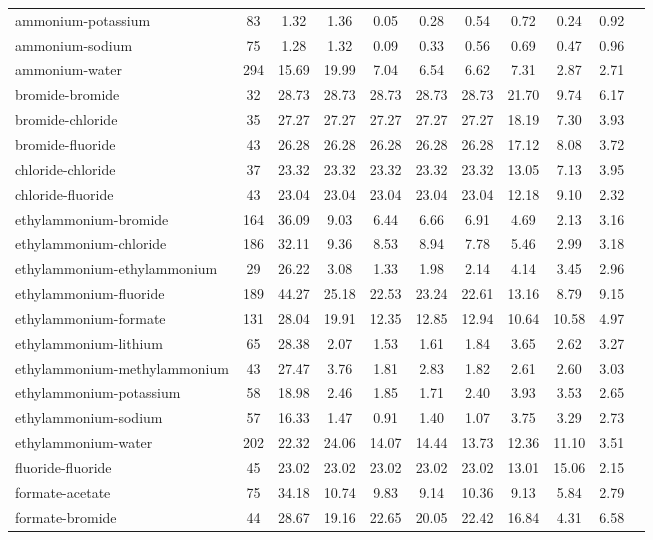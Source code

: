 \begin{longtable}{lcccccccccc}
ammonium-potassium & 83  & 1.32 & 1.36 & 0.05 & 0.28 & 0.54 & 0.72 & 0.24 & 0.92\\
ammonium-sodium & 75  & 1.28 & 1.32 & 0.09 & 0.33 & 0.56 & 0.69 & 0.47 & 0.96\\
ammonium-water & 294  & 15.69 & 19.99 & 7.04 & 6.54 & 6.62 & 7.31 & 2.87 & 2.71\\
bromide-bromide & 32  & 28.73 & 28.73 & 28.73 & 28.73 & 28.73 & 21.70 & 9.74 & 6.17\\
bromide-chloride & 35  & 27.27 & 27.27 & 27.27 & 27.27 & 27.27 & 18.19 & 7.30 & 3.93\\
bromide-fluoride & 43  & 26.28 & 26.28 & 26.28 & 26.28 & 26.28 & 17.12 & 8.08 & 3.72\\
chloride-chloride & 37  & 23.32 & 23.32 & 23.32 & 23.32 & 23.32 & 13.05 & 7.13 & 3.95\\
chloride-fluoride & 43  & 23.04 & 23.04 & 23.04 & 23.04 & 23.04 & 12.18 & 9.10 & 2.32\\
ethylammonium-bromide & 164  & 36.09 & 9.03 & 6.44 & 6.66 & 6.91 & 4.69 & 2.13 & 3.16\\
ethylammonium-chloride & 186  & 32.11 & 9.36 & 8.53 & 8.94 & 7.78 & 5.46 & 2.99 & 3.18\\
ethylammonium-ethylammonium & 29  & 26.22 & 3.08 & 1.33 & 1.98 & 2.14 & 4.14 & 3.45 & 2.96\\
ethylammonium-fluoride & 189  & 44.27 & 25.18 & 22.53 & 23.24 & 22.61 & 13.16 & 8.79 & 9.15\\
ethylammonium-formate & 131  & 28.04 & 19.91 & 12.35 & 12.85 & 12.94 & 10.64 & 10.58 & 4.97\\
ethylammonium-lithium & 65  & 28.38 & 2.07 & 1.53 & 1.61 & 1.84 & 3.65 & 2.62 & 3.27\\
ethylammonium-methylammonium & 43  & 27.47 & 3.76 & 1.81 & 2.83 & 1.82 & 2.61 & 2.60 & 3.03\\
ethylammonium-potassium & 58  & 18.98 & 2.46 & 1.85 & 1.71 & 2.40 & 3.93 & 3.53 & 2.65\\
ethylammonium-sodium & 57  & 16.33 & 1.47 & 0.91 & 1.40 & 1.07 & 3.75 & 3.29 & 2.73\\
ethylammonium-water & 202  & 22.32 & 24.06 & 14.07 & 14.44 & 13.73 & 12.36 & 11.10 & 3.51\\
fluoride-fluoride & 45  & 23.02 & 23.02 & 23.02 & 23.02 & 23.02 & 13.01 & 15.06 & 2.15\\
formate-acetate & 75  & 34.18 & 10.74 & 9.83 & 9.14 & 10.36 & 9.13 & 5.84 & 2.79\\
formate-bromide & 44  & 28.67 & 19.16 & 22.65 & 20.05 & 22.42 & 16.84 & 4.31 & 6.58\\

\end{longtable}
